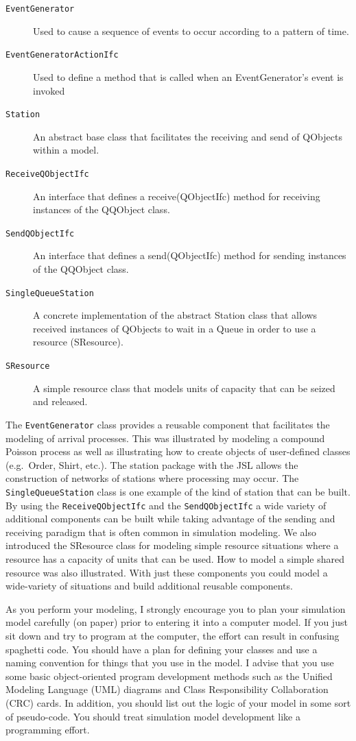\documentclass[
]{book}
\theoremstyle{definition}
\theoremstyle{definition}
\theoremstyle{definition}
\theoremstyle{definition}
\theoremstyle{remark}
\begin{document}
\begin{description}
\item[\texttt{EventGenerator}]
Used to cause a sequence of events to occur according to a pattern
of time.
\item[\texttt{EventGeneratorActionIfc}]
Used to define a method that is called when an EventGenerator's
event is invoked
\item[\texttt{Station}]
An abstract base class that facilitates the receiving and send of
QObjects within a model.
\item[\texttt{ReceiveQObjectIfc}]
An interface that defines a receive(QObjectIfc) method for receiving
instances of the QQObject class.
\item[\texttt{SendQObjectIfc}]
An interface that defines a send(QObjectIfc) method for sending
instances of the QQObject class.
\item[\texttt{SingleQueueStation}]
A concrete implementation of the abstract Station class that allows
received instances of QObjects to wait in a Queue in order to use a
resource (SResource).
\item[\texttt{SResource}]
A simple resource class that models units of capacity that can be
seized and released.
\end{description}

The \texttt{EventGenerator} class provides a reusable component that facilitates
the modeling of arrival processes. This was illustrated by modeling a
compound Poisson process as well as illustrating how to create objects
of user-defined classes (e.g.~Order, Shirt, etc.). The station package
with the JSL allows the construction of networks of stations where
processing may occur. The \texttt{SingleQueueStation} class is one example of the
kind of station that can be built. By using the \texttt{ReceiveQObjectIfc} and
the \texttt{SendQObjectIfc} a wide variety of additional components can be built
while taking advantage of the sending and receiving paradigm that is
often common in simulation modeling. We also introduced the SResource
class for modeling simple resource situations where a resource has a
capacity of units that can be used. How to model a simple shared
resource was also illustrated. With just these components you could
model a wide-variety of situations and build additional reusable
components.

As you perform your modeling, I strongly encourage you to plan your
simulation model carefully (on paper) prior to entering it into a
computer model. If you just sit down and try to program at the computer,
the effort can result in confusing spaghetti code. You should have a
plan for defining your classes and use a naming convention for things
that you use in the model. I advise that you use some basic
object-oriented program development methods such as the Unified Modeling
Language (UML) diagrams and Class Responsibility Collaboration (CRC)
cards. In addition, you should list out the logic of your model in some
sort of pseudo-code. You should treat simulation model development like
a programming effort.
\end{document}
